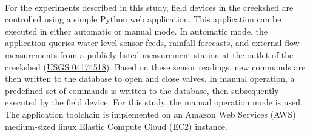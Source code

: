 \

For the experiments described in this study, field devices in the creekshed are controlled using a simple Python web application. This application can be executed in either automatic or manual mode. In automatic mode, the application queries water level sensor feeds, rainfall forecasts, and external flow measurements from a publicly-listed measurement station at the outlet of the creekshed (\href{https://waterdata.usgs.gov/usa/nwis/uv?04174518}{USGS 04174518}). Based on these sensor readings, new commands are then written to the database to open and close valves. In manual operation, a predefined set of commands is written to the database, then subsequently executed by the field device. For this study, the manual operation mode is used. 
The application toolchain is implemented on an Amazon Web Services (AWS) medium-sized linux Elastic Compute Cloud (EC2) instance. 




